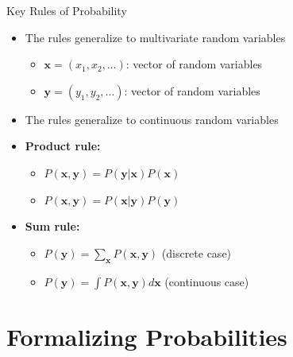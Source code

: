 \documentclass{beamer}
\begin{document}
\begin{frame}{Key Rules of Probability}
  \begin{itemize}
  \item The rules generalize to multivariate random variables
    \begin{itemize}
      \item $\mathbf{x} = (x_1, x_2, \ldots)$: vector of random variables
      \item $\mathbf{y} = (y_1, y_2, \ldots)$: vector of random variables
      \end{itemize}
    \item The rules generalize to continuous random variables

    \item \textbf{Product rule:}
      \begin{itemize}
      \item $P(\mathbf{x}, \mathbf{y}) = P(\mathbf{y}|\mathbf{x})P(\mathbf{x})$
      \item $P(\mathbf{x}, \mathbf{y}) = P(\mathbf{x}|\mathbf{y})P(\mathbf{y})$
      \end{itemize}
    \item \textbf{Sum rule:}
      \begin{itemize}
      \item $P(\mathbf{y}) = \sum_{\mathbf{x}} P(\mathbf{x}, \mathbf{y})$ (discrete case)
      \item $P(\mathbf{y}) = \int P(\mathbf{x}, \mathbf{y}) d\mathbf{x}$ (continuous case)
      \end{itemize}
    \end{itemize}
\end{frame}

\section{Formalizing Probabilities}
\end{document}
